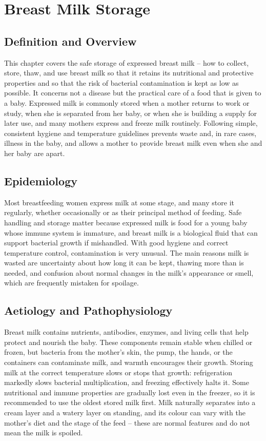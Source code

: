 \chapter{Breast Milk Storage}

\section*{Definition and Overview}
This chapter covers the safe storage of expressed breast milk -- how to collect, store, thaw, and use breast milk so that it retains its nutritional and protective properties and so that the risk of bacterial contamination is kept as low as possible. It concerns not a disease but the practical care of a food that is given to a baby. Expressed milk is commonly stored when a mother returns to work or study, when she is separated from her baby, or when she is building a supply for later use, and many mothers express and freeze milk routinely. Following simple, consistent hygiene and temperature guidelines prevents waste and, in rare cases, illness in the baby, and allows a mother to provide breast milk even when she and her baby are apart.

\section*{Epidemiology}
Most breastfeeding women express milk at some stage, and many store it regularly, whether occasionally or as their principal method of feeding. Safe handling and storage matter because expressed milk is food for a young baby whose immune system is immature, and breast milk is a biological fluid that can support bacterial growth if mishandled. With good hygiene and correct temperature control, contamination is very unusual. The main reasons milk is wasted are uncertainty about how long it can be kept, thawing more than is needed, and confusion about normal changes in the milk's appearance or smell, which are frequently mistaken for spoilage.

\section*{Aetiology and Pathophysiology}
Breast milk contains nutrients, antibodies, enzymes, and living cells that help protect and nourish the baby. These components remain stable when chilled or frozen, but bacteria from the mother's skin, the pump, the hands, or the containers can contaminate milk, and warmth encourages their growth. Storing milk at the correct temperature slows or stops that growth: refrigeration markedly slows bacterial multiplication, and freezing effectively halts it. Some nutritional and immune properties are gradually lost even in the freezer, so it is recommended to use the oldest stored milk first. Milk naturally separates into a cream layer and a watery layer on standing, and its colour can vary with the mother's diet and the stage of the feed -- these are normal features and do not mean the milk is spoiled.


